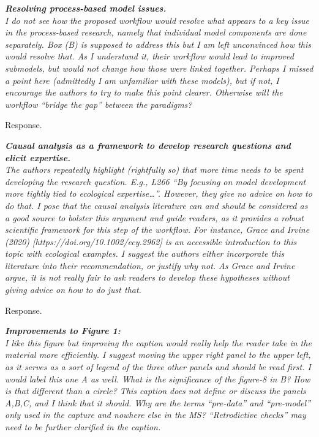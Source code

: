 \documentclass[11pt,letter]{article}
\begin{document}
\begin{mybox}
\emph{\textbf{Resolving process-based model issues.}\\
I do not see how the proposed workflow would resolve what appears to a key issue in the process-based
research, namely that individual model components are done separately. Box (B) is supposed to address
this but I am left unconvinced how this would resolve that. As I understand it, their workflow would lead
to improved submodels, but would not change how those were linked together. Perhaps I missed a
point here (admittedly I am unfamiliar with these models), but if not, I encourage the authors to try to
make this point clearer. Otherwise will the workflow “bridge the gap” between the paradigms?}
\end{mybox}

Response.

\begin{mybox}
\emph{\textbf{Causal analysis as a framework to develop research questions and elicit expertise.}\\
The authors repeatedly highlight (rightfully so) that more time needs to be spent developing the research question. E.g., L266 “By focusing on model development more tightly tied to ecological expertise…”. However, they give no advice on how to do that. I pose that the causal analysis literature can and should be considered as a good source to bolster this argument and guide readers, as it provides a robust scientific framework for this step of the workflow. For instance, Grace and Irvine (2020) [https://doi.org/10.1002/ecy.2962] is an accessible introduction to this topic with ecological examples. I suggest the authors either incorporate this literature into their recommendation, or justify why not. As Grace and Irvine argue, it is not really fair to ask readers to develop these hypotheses without giving advice on how to do just that.}
\end{mybox}

Response.

\begin{mybox}
\emph{\textbf{Improvements to Figure 1:}\\
I like this figure but improving the caption would really help the reader take in the material more efficiently. I suggest moving the upper right panel to the upper left, as it serves as a sort of legend of the three other panels and should be read first. I would label this one A as well. What is the significance of the figure-8 in B? How is that different than a circle? This caption does not define or discuss the panels A,B,C, and I think that it should. Why are the terms “pre-data” and “pre-model” only used in the capture and nowhere else in the MS? “Retrodictive checks” may need to be further clarified in the caption.}
\end{mybox}
\end{document}
